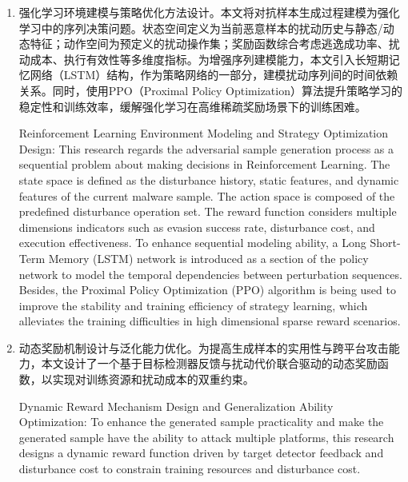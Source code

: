 \begin{enumerate} [label=\arabic*)]
Introducing Benign Sample Feature Disturbance Mechanism: Different from traditional methods using random noise or invalid padding bytes, this study innovatively introduces feature byte sequences that are extracted from real benign software samples as disturbance byte sources. This method enhances the "benign concealment effect" of adversarial samples and increases the misjudgment rate of malware detection systems. By constructing a benign byte repository and through encoding and filtering its semantic information, it prioritizes selecting benign fragments similar to the target sample to embed in the target sample during disturbance, which improves the interpretability and obfuscation capability of generated samples.
\item 强化学习环境建模与策略优化方法设计。本文将对抗样本生成过程建模为强化学习中的序列决策问题。状态空间定义为当前恶意样本的扰动历史与静态/动态特征；动作空间为预定义的扰动操作集；奖励函数综合考虑逃逸成功率、扰动成本、执行有效性等多维度指标。为增强序列建模能力，本文引入长短期记忆网络（LSTM）结构，作为策略网络的一部分，建模扰动序列间的时间依赖关系。同时，使用PPO（Proximal Policy Optimization）算法提升策略学习的稳定性和训练效率，缓解强化学习在高维稀疏奖励场景下的训练困难。

Reinforcement Learning Environment Modeling and Strategy Optimization Design: This research regards the adversarial sample generation process as a sequential problem about making decisions in Reinforcement Learning. The state space is defined as the disturbance history, static features, and dynamic features of the current malware sample. The action space is composed of the predefined disturbance operation set. The reward function considers multiple dimensions indicators such as evasion success rate, disturbance cost, and execution effectiveness. To enhance sequential modeling ability, a Long Short-Term Memory (LSTM) network is introduced as a section of the policy network to model the temporal dependencies between perturbation sequences. Besides, the Proximal Policy Optimization (PPO) algorithm is being used to improve the stability and training efficiency of strategy learning, which alleviates the training difficulties in high dimensional sparse reward scenarios.
\item 动态奖励机制设计与泛化能力优化。为提高生成样本的实用性与跨平台攻击能力，本文设计了一个基于目标检测器反馈与扰动代价联合驱动的动态奖励函数，以实现对训练资源和扰动成本的双重约束。		

Dynamic Reward Mechanism Design and Generalization Ability Optimization: To enhance the generated sample practicality and make the generated sample have the ability to attack multiple platforms, this research designs a dynamic reward function driven by target detector feedback and disturbance cost to constrain training resources and disturbance cost.
\end{enumerate}

